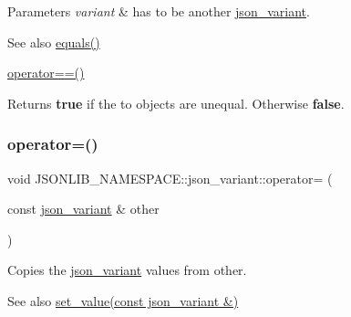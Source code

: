 \begin{DoxyParams}{Parameters}
{\em variant} & has to be another \hyperlink{classJSONLIB__NAMESPACE_1_1json__variant}{json\+\_\+variant}. \\
\hline
\end{DoxyParams}
\begin{DoxySeeAlso}{See also}
\hyperlink{classJSONLIB__NAMESPACE_1_1json__variant_ae68b9cb156c2b2f9e12c7f889634b63a}{equals()} 

\hyperlink{classJSONLIB__NAMESPACE_1_1json__variant_aef1fc1a342cc170da06e0d3eb1299aad}{operator==()} 
\end{DoxySeeAlso}
\begin{DoxyReturn}{Returns}
{\bfseries true} if the to objects are unequal. Otherwise {\bfseries false}. 
\end{DoxyReturn}
\mbox{\label{classJSONLIB__NAMESPACE_1_1json__variant_acab384801617885ba1dc3b965a456e7e}} 
\subsubsection{\texorpdfstring{operator=()}{operator=()}}
{\footnotesize\ttfamily void J\+S\+O\+N\+L\+I\+B\+\_\+\+N\+A\+M\+E\+S\+P\+A\+C\+E\+::json\+\_\+variant\+::operator= (\begin{DoxyParamCaption}\item[{const \hyperlink{classJSONLIB__NAMESPACE_1_1json__variant}{json\+\_\+variant} \&}]{other }\end{DoxyParamCaption})\hspace{0.3cm}{\ttfamily [inline]}}



Copies the \hyperlink{classJSONLIB__NAMESPACE_1_1json__variant}{json\+\_\+variant} values from {\ttfamily other}. 

\begin{DoxySeeAlso}{See also}
\hyperlink{classJSONLIB__NAMESPACE_1_1json__variant_a75b05acb8473015edd7f21de1656b2b1}{set\+\_\+value(const json\+\_\+variant \&)} 
\end{DoxySeeAlso}
\mbox{\label{classJSONLIB__NAMESPACE_1_1json__variant_aef1fc1a342cc170da06e0d3eb1299aad}} 
